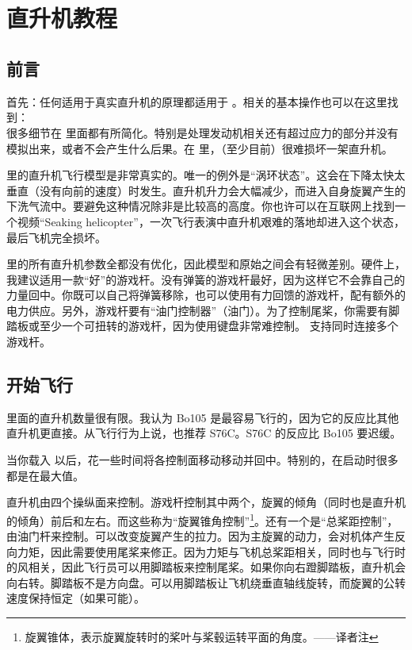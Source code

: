 \ifchinese
\chapter{{\\}直升机教程}
\label{helicopter}

\section{前言}

首先：任何适用于真实直升机的原理都适用于 \FlightGear。相关的基本操作也可以在这里找到：\\ 很多细节在 \FlightGear 里面都有所简化。特别是处理发动机相关还有超过应力的部分并没有模拟出来，或者不会产生什么后果。在 \FlightGear 里，（至少目前）很难损坏一架直升机。


\FlightGear 里的直升机飞行模型是非常真实的。唯一的例外是“涡环状态”。这会在下降太快太垂直（没有向前的速度）时发生。直升机升力会大幅减少，而进入自身旋翼产生的下洗气流中。要避免这种情况除非是比较高的高度。你也许可以在互联网上找到一个视频“Seaking helicopter”，一次飞行表演中直升机艰难的落地却进入这个状态，最后飞机完全损坏。

\FlightGear 里的所有直升机参数全都没有优化，因此模型和原始之间会有轻微差别。硬件上，我建议适用一款“好”的游戏杆。没有弹簧的游戏杆最好，因为这样它不会靠自己的力量回中。你既可以自己将弹簧移除，也可以使用有力回馈的游戏杆，配有额外的电力供应。另外，游戏杆要有“油门控制器”（油门）。为了控制尾桨，你需要有脚踏板或至少一个可扭转的游戏杆，因为使用键盘非常难控制。\FlightGear{} 支持同时连接多个游戏杆。

\section{开始飞行}

\FlightGear{} 里面的直升机数量很有限。我认为 Bo105 是最容易飞行的，因为它的反应比其他直升机更直接。从飞行行为上说，也推荐 S76C。S76C 的反应比 Bo105 要迟缓。

当你载入 \FlightGear 以后，花一些时间将各控制面移动移动并回中。特别的，在启动时很多都是在最大值。


直升机由四个操纵面来控制。游戏杆控制其中两个，旋翼的倾角（同时也是直升机的倾角）前后和左右。而这些称为“旋翼锥角控制”\footnote{旋翼锥体，表示旋翼旋转时的桨叶与桨毂运转平面的角度。——译者注}。还有一个是“总桨距控制”，由油门杆来控制。可以改变旋翼产生的拉力。因为主旋翼的动力，会对机体产生反向力矩，因此需要使用尾桨来修正。因为力矩与飞机总桨距相关，同时也与飞行时的风相关，因此飞行员可以用脚踏板来控制尾桨。如果你向右蹬脚踏板，直升机会向右转。脚踏板不是方向盘。可以用脚踏板让飞机绕垂直轴线旋转，而旋翼的公转速度保持恒定（如果可能）。

